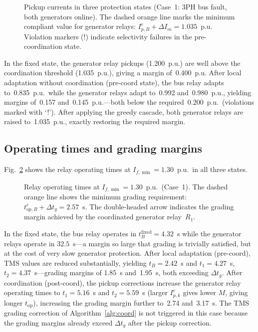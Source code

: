 \documentclass[journal,twoside,letterpaper]{IEEEtran}
\begin{document}
\begin{figure}[!t]
  \centering
  
  \caption{Pickup currents in three protection states
    (Case~1: 3PH bus fault, both generators online).
    The dashed orange line marks the minimum compliant
    value for generator relays:
    $I_{p,B}^c + \Delta I_m = 1.035$~p.u.
    Violation markers (!) indicate selectivity failures
    in the pre-coordination state.}
  \label{fig:pickup_bars}
\end{figure}

In the fixed state, the generator relay pickups
(1.200~p.u.) are well above the coordination threshold
(1.035~p.u.), giving a margin of~0.400~p.u.
After local adaptation without coordination
(pre-coord state), the bus relay adapts to~0.835~p.u.\
while the generator relays adapt to~0.992 and~0.980~p.u.,
yielding margins of~0.157 and~0.145~p.u.---both below the
required~0.200~p.u.\ (violations marked with `!').
After applying the greedy cascade, both generator relays
are raised to~1.035~p.u., exactly restoring the
required margin.

\subsection{Operating times and grading margins}

Fig.~\ref{fig:triptime_bars} shows the relay operating
times at $I_{f,\min} = 1.30$~p.u.\ in all three states.

\begin{figure}[!t]
  \centering
  
  \caption{Relay operating times at
    $I_{f,\min} = 1.30$~p.u.\ (Case~1).
    The dashed orange line shows the minimum grading
    requirement: $t_{op,B}^c + \Delta t_g = 2.57$~s.
    The double-headed arrow indicates the grading margin
    achieved by the coordinated generator relay~$R_1$.}
  \label{fig:triptime_bars}
\end{figure}

In the fixed state, the bus relay operates in
$t_B^{\mathrm{fixed}} = 4.32$~s while the generator
relays operate in $32.5$~s---a margin so large that
grading is trivially satisfied, but at the cost of very
slow generator protection.
After local adaptation (pre-coord), TMS values are reduced
substantially, yielding $t_B = 2.42$~s and
$t_1 = 4.27$~s, $t_2 = 4.37$~s---grading margins of
1.85~s and~1.95~s, both exceeding $\Delta t_g$.
After coordination (post-coord), the pickup corrections
increase the generator relay operating times to
$t_1 = 5.16$~s and $t_2 = 5.59$~s (larger $I_{p,k}^c$
gives lower $M$, giving longer $t_{\mathrm{op}}$),
increasing the grading margin further to~2.74 and~3.17~s.
The TMS grading correction of Algorithm~\ref{alg:coord}
is not triggered in this case because the grading
margins already exceed $\Delta t_g$ after the pickup
correction.
\end{document}
